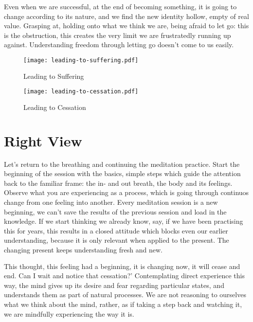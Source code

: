 Even when we are successful, at the end of becoming something, it is
going to change according to its nature, and we find the new identity
hollow, empty of real value. Grasping at, holding onto what we think we
are, being afraid to let go: this is the obstruction, this creates the
very limit we are frustratedly running up against. Understanding freedom
through letting go doesn't come to us easily.

\cleartoverso

\begin{figure}[h]
\caption{Leading to Suffering}\label{fig-leading-to-suffering}

\centering

\texttt{[image: leading-to-suffering.pdf]}

\end{figure}

\clearpage

\begin{figure}[h]
\caption{Leading to Cessation}\label{fig-leading-to-cessation}

\centering

\texttt{[image: leading-to-cessation.pdf]}

\end{figure}

\clearpage

\section{Right View}


Let's return to the breathing and continuing the meditation practice.
Start the beginning of the session with the basics, simple steps which
guide the attention back to the familiar frame: the in- and out breath,
the body and its feelings. Observe what you are experiencing as a
process, which is going through continuos change from one feeling into
another. Every meditation session is a new beginning, we can't save the
results of the previous session and load in the knowledge. If we start
thinking we already know, say, if we have been practising this for
years, this results in a closed attitude which blocks even our earlier
understanding, because it is only relevant when applied to the present.
The changing present keeps understanding fresh and new.

This thought, this feeling had a beginning, it is changing now, it will
cease and end. Can I wait and notice that cessation?' Contemplating
direct experience this way, the mind gives up its desire and fear
regarding particular states, and understands them as part of natural
processes. We are not reasoning to ourselves what we think about the
mind, rather, as if taking a step back and watching it, we are mindfully
experiencing the way it is.

